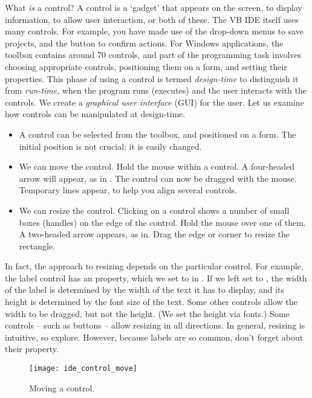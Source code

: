 		What \emph{is} a control? A control is a ‘gadget’ that appears on the screen, to display 
information, to allow user interaction, or both of these. The VB IDE itself uses many controls. For example, you have made use of the drop-down menus to save projects, and the  button to confirm actions. For Windows applications, the toolbox contains around 70 controls, and part of the programming task involves choosing appropriate controls, positioning them on a form, and setting their properties. This phase of using a control is termed \emph{design-time} to distinguish it from \emph{run-time}, when the program runs (executes) and the user interacts with the controls. We create a \emph{graphical user interface} (GUI) for the user. Let us examine how controls can be manipulated at design-time.
		\begin{itemize}
			\item	A control can be selected from the toolbox, and positioned on a form. The initial position is not crucial; it is easily changed.
			\item	We can move the control. Hold the mouse within a control. A four-headed arrow will appear, as in . The control can now be dragged with the mouse. Temporary lines appear, to help you align several controls.
			\item	We can resize the control. Clicking on a control shows a number of small boxes (handles) on the edge of the control. Hold the mouse over one of them. A two-headed arrow appears, as in. Drag the edge or corner to resize the rectangle.
		\end{itemize}
		In fact, the approach to resizing depends on the particular control. For example, the label control has an  property, which we set to  in . If we left  set to , the width of the label is determined by the width of the text it has to display, and its height is determined by the font size of the text. Some other controls allow the width to be dragged, but not the height. (We set the height via fonts.) Some controls – such as buttons – allow resizing in all directions. In general, resizing is intuitive, so explore. However, because labels are so common, don’t forget about their  property.
	
		\begin{figure}[ht]
			\centering
			\texttt{[image: ide\_control\_move]}
			\caption{Moving a control.}
			\label{fig:ide_control_move}
		\end{figure}

